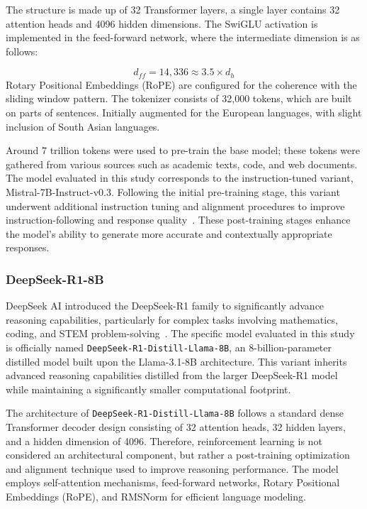 \documentclass[10pt,letterpaper]{article}
\begin{document}
The structure is made up of 32 Transformer layers, a single layer contains 32 attention heads and 4096 hidden dimensions. The SwiGLU activation is implemented in the feed-forward network, where the intermediate dimension is as follows: 

\begin{equation}
d_{ff} = 14{,}336 \approx 3.5 \times d_h
\label{eq:mistral_ffn}
\end{equation}
Rotary Positional Embeddings (RoPE) are configured for the coherence with the sliding window pattern. The tokenizer consists of 32,000 tokens, which are built on parts of sentences. Initially augmented for the European languages, with slight inclusion of South Asian languages. 

Around 7 trillion tokens were used to pre-train the base model; these tokens were gathered from various sources such as academic texts, code, and web documents. The model evaluated in this study corresponds to the instruction-tuned variant, Mistral-7B-Instruct-v0.3. Following the initial pre-training stage, this variant underwent additional instruction tuning and alignment procedures to improve instruction-following and response quality~\cite{b37}. These post-training stages enhance the model’s ability to generate more accurate and contextually appropriate responses.


\subsubsection*{DeepSeek-R1-8B}

DeepSeek AI introduced the DeepSeek-R1 family to significantly advance reasoning capabilities, particularly for complex tasks involving mathematics, coding, and STEM problem-solving~\cite{b38}. The specific model evaluated in this study is officially named \texttt{DeepSeek-R1-Distill-Llama-8B}, an 8-billion-parameter distilled model built upon the Llama-3.1-8B architecture. This variant inherits advanced reasoning capabilities distilled from the larger DeepSeek-R1 model while maintaining a significantly smaller computational footprint.

The architecture of \texttt{DeepSeek-R1-Distill-Llama-8B} follows a standard dense Transformer decoder design consisting of 32 attention heads, 32 hidden layers, and a hidden dimension of 4096. Therefore, reinforcement learning is not considered an architectural component, but rather a post-training optimization and alignment technique used to improve reasoning performance. The model employs self-attention mechanisms, feed-forward networks, Rotary Positional Embeddings (RoPE), and RMSNorm for efficient language modeling.
\end{document}
